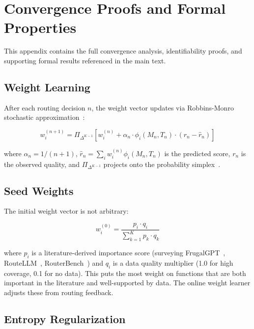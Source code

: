 \section{Convergence Proofs and Formal Properties}
\label{sec:app_convergence}

This appendix contains the full convergence analysis, identifiability proofs, and supporting formal results referenced in the main text.

\subsection{Weight Learning}

After each routing decision $n$, the weight vector updates via Robbins-Monro stochastic approximation~\citep{robbins1951stochastic}:

\begin{equation}
\label{eq:rm_update}
w_i^{(n+1)} = \Pi_{\Delta^{K-1}}\left[w_i^{(n)} + \alpha_n \cdot \phi_i(M_n, T_n) \cdot (r_n - \hat{r}_n)\right]
\end{equation}

where $\alpha_n = 1/(n+1)$, $\hat{r}_n = \sum_i w_i^{(n)} \phi_i(M_n, T_n)$ is the predicted score, $r_n$ is the observed quality, and $\Pi_{\Delta^{K-1}}$ projects onto the probability simplex~\citep{duchi2008simplex}.

\subsection{Seed Weights}

The initial weight vector is not arbitrary:

\begin{equation}
\label{eq:seed_weights}
w_i^{(0)} = \frac{p_i \cdot q_i}{\sum_{k=1}^K p_k \cdot q_k}
\end{equation}

where $p_i$ is a literature-derived importance score (surveying FrugalGPT~\citep{chen2023frugalgpt}, RouteLLM~\citep{ong2024routellm}, RouterBench~\citep{hu2024routerbench}) and $q_i$ is a data quality multiplier (1.0 for high coverage, 0.1 for no data). This puts the most weight on functions that are both important in the literature and well-supported by data. The online weight learner adjusts these from routing feedback.

\subsection{Entropy Regularization}

